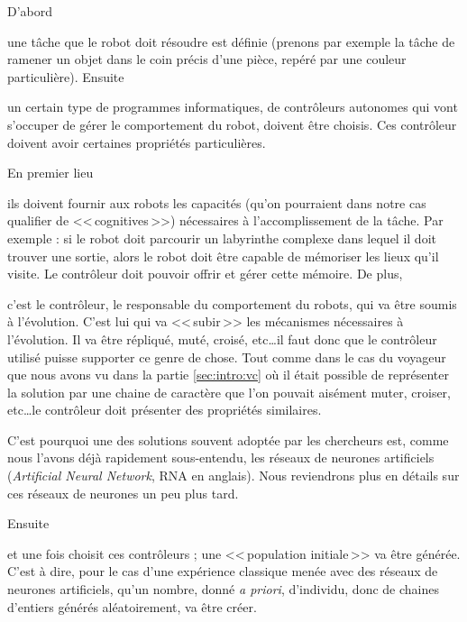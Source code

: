 \begin{inparaenum}[(\itshape 1\upshape)]
D'abord \item une tâche que le robot doit résoudre est définie (prenons par exemple la tâche de ramener un objet dans le coin précis d'une pièce, repéré par une couleur particulière).
Ensuite \item un certain type de programmes informatiques, de contrôleurs autonomes qui vont s'occuper de gérer le comportement du robot, doivent être choisis.
Ces contrôleur doivent avoir certaines propriétés particulières.
\begin{inparaenum}
En premier lieu \item ils doivent fournir aux robots les capacités (qu'on pourraient dans notre cas qualifier de <<\,cognitives\,>>) nécessaires à l'accomplissement de la tâche. Par exemple : si le robot doit parcourir un labyrinthe complexe dans lequel il doit trouver une sortie, alors le robot doit être capable de mémoriser les lieux qu'il visite. Le contrôleur doit pouvoir offrir et gérer cette mémoire.
    De plus,\item c'est le contrôleur, le responsable du comportement du robots, qui va être soumis à l'évolution. C'est lui qui va <<\,subir\,>> les mécanismes nécessaires à l'évolution. Il va être répliqué, muté, croisé, etc\ldots il faut donc que le contrôleur utilisé puisse supporter ce genre de chose. Tout comme dans le cas du voyageur que nous avons vu dans la partie \ref{sec:intro:vc} où il était possible de représenter la solution par une chaine de caractère que l'on pouvait aisément muter, croiser, etc\ldots le contrôleur doit présenter des propriétés similaires.
\end{inparaenum}
C'est pourquoi une des solutions souvent adoptée par les chercheurs est, comme nous l'avons déjà rapidement sous-entendu, les réseaux de neurones artificiels (\emph{Artificial Neural Network}, RNA en anglais). Nous reviendrons plus en détails sur ces réseaux de neurones un peu plus tard. \label{it:RNA}

Ensuite \item et une fois choisit ces contrôleurs ; une <<\,population initiale\,>> va être générée. C'est à dire, pour le cas d'une expérience classique menée avec des réseaux de neurones artificiels, qu'un nombre, donné \emph{a priori}, d'individu, donc de chaines d'entiers générés aléatoirement, va être créer.


\end{inparaenum}
